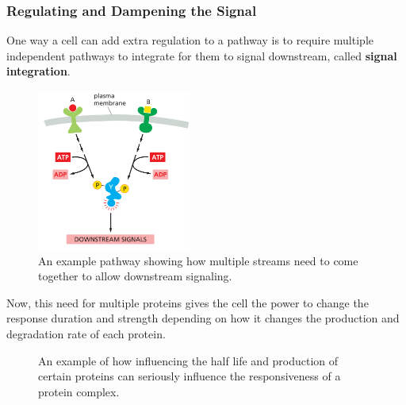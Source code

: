 \documentclass[../main.tex]{subfiles}
\begin{document}
\subsubsection{Regulating and Dampening the Signal}

One way a cell can add extra regulation to a pathway is to require multiple independent pathways to integrate for them to signal downstream, called \textbf{signal integration}.
\begin{figure}[H]
	\centering
	\includegraphics[width=0.45\textwidth]{reg_int}
	\caption{An example pathway showing how multiple streams need to come together to allow downstream signaling.}
\end{figure}

Now, this need for multiple proteins gives the cell the power to change the response duration and strength depending on how it changes the production and degradation rate of each protein. 

\begin{figure}[H]
	\centering
	\hfill
	\hfill
	\caption{An example of how influencing the half life and production of certain proteins can seriously influence the responsiveness of a protein complex.}
\end{figure}
\end{document}
